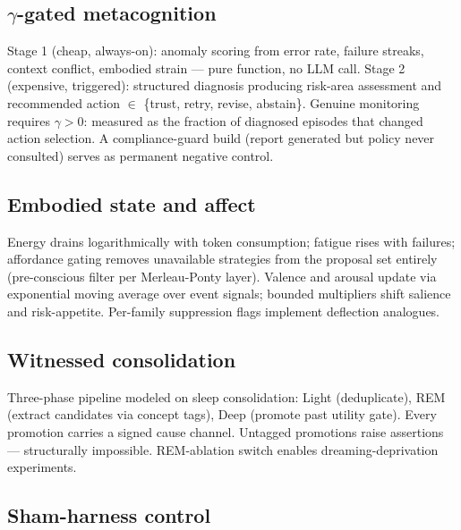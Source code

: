\documentclass[11pt]{article}
\begin{document}
\subsection{$\gamma$-gated metacognition}

Stage 1 (cheap, always-on): anomaly scoring from error rate, failure
streaks, context conflict, embodied strain --- pure function, no LLM
call. Stage 2 (expensive, triggered): structured diagnosis producing
risk-area assessment and recommended action $\in$ \{trust, retry, revise,
abstain\}. Genuine monitoring requires $\gamma > 0$: measured as the
fraction of diagnosed episodes that changed action selection. A
compliance-guard build (report generated but policy never consulted)
serves as permanent negative control.

\subsection{Embodied state and affect}

Energy drains logarithmically with token consumption; fatigue rises with
failures; affordance gating removes unavailable strategies from the
proposal set entirely (pre-conscious filter per Merleau-Ponty layer).
Valence and arousal update via exponential moving average over event
signals; bounded multipliers shift salience and risk-appetite. Per-family
suppression flags implement deflection analogues.

\subsection{Witnessed consolidation}

Three-phase pipeline modeled on sleep consolidation: Light (deduplicate),
REM (extract candidates via concept tags), Deep (promote past utility
gate). Every promotion carries a signed cause channel. Untagged
promotions raise assertions --- structurally impossible. REM-ablation
switch enables dreaming-deprivation experiments.

\subsection{Sham-harness control}
\end{document}
